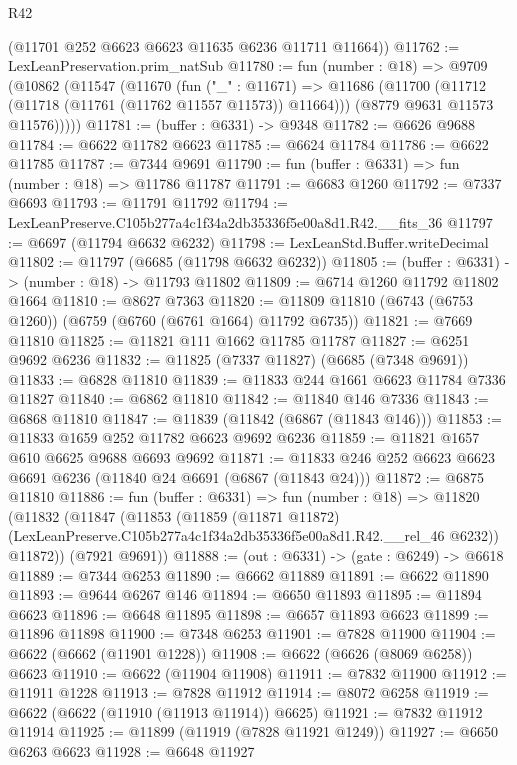 \begin{lexlean}{R42}
\begin{coremodule}
{      (@11701 @252 @6623 @6623 @11635 @6236 @11711 @11664))
@11762 := LexLeanPreservation.prim_natSub
@11780 := fun (number : @18) =>
  @9709
    (@10862
      (@11547
        (@11670
          (fun ("_" : @11671) =>
          @11686
            (@11700 (@11712 (@11718 (@11761 (@11762 @11557 @11573)) @11664)))
            (@8779 @9631 @11573 @11576)))))
@11781 := (buffer : @6331) -> @9348
@11782 := @6626 @9688
@11784 := @6622 @11782 @6623
@11785 := @6624 @11784
@11786 := @6622 @11785
@11787 := @7344 @9691
@11790 := fun (buffer : @6331) => fun (number : @18) => @11786 @11787
@11791 := @6683 @1260
@11792 := @7337 @6693
@11793 := @11791 @11792
@11794 := LexLeanPreserve.C105b277a4c1f34a2db35336f5e00a8d1.R42.__fits_36
@11797 := @6697 (@11794 @6632 @6232)
@11798 := LexLeanStd.Buffer.writeDecimal
@11802 := @11797 (@6685 (@11798 @6632 @6232))
@11805 := (buffer : @6331) -> (number : @18) -> @11793 @11802
@11809 := @6714 @1260 @11792 @11802 @1664
@11810 := @8627 @7363
@11820 := @11809 @11810 (@6743 (@6753 @1260)) (@6759 (@6760 (@6761 @1664) @11792 @6735))
@11821 := @7669 @11810
@11825 := @11821 @111 @1662 @11785 @11787
@11827 := @6251 @9692 @6236
@11832 := @11825 (@7337 @11827) (@6685 (@7348 @9691))
@11833 := @6828 @11810
@11839 := @11833 @244 @1661 @6623 @11784 @7336 @11827
@11840 := @6862 @11810
@11842 := @11840 @146 @7336
@11843 := @6868 @11810
@11847 := @11839 (@11842 (@6867 (@11843 @146)))
@11853 := @11833 @1659 @252 @11782 @6623 @9692 @6236
@11859 := @11821 @1657 @610 @6625 @9688 @6693 @9692
@11871 := @11833 @246 @252 @6623 @6623 @6691 @6236 (@11840 @24 @6691 (@6867 (@11843 @24)))
@11872 := @6875 @11810
@11886 := fun (buffer : @6331) =>
  fun (number : @18) =>
  @11820
    (@11832
      (@11847
        (@11853
          (@11859
            (@11871 @11872)
            (LexLeanPreserve.C105b277a4c1f34a2db35336f5e00a8d1.R42.__rel_46 @6232))
          @11872))
      (@7921 @9691))
@11888 := (out : @6331) -> (gate : @6249) -> @6618
@11889 := @7344 @6253
@11890 := @6662 @11889
@11891 := @6622 @11890
@11893 := @9644 @6267 @146
@11894 := @6650 @11893
@11895 := @11894 @6623
@11896 := @6648 @11895
@11898 := @6657 @11893 @6623
@11899 := @11896 @11898
@11900 := @7348 @6253
@11901 := @7828 @11900
@11904 := @6622 (@6662 (@11901 @1228))
@11908 := @6622 (@6626 (@8069 @6258)) @6623
@11910 := @6622 (@11904 @11908)
@11911 := @7832 @11900
@11912 := @11911 @1228
@11913 := @7828 @11912
@11914 := @8072 @6258
@11919 := @6622 (@6622 (@11910 (@11913 @11914)) @6625)
@11921 := @7832 @11912 @11914
@11925 := @11899 (@11919 (@7828 @11921 @1249))
@11927 := @6650 @6263 @6623
@11928 := @6648 @11927
}
\end{coremodule}
\end{lexlean}
